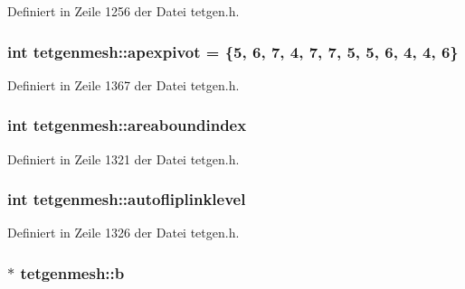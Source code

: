 Definiert in Zeile 1256 der Datei tetgen.\-h.

\hypertarget{classtetgenmesh_a0322a7ed3ee115cb852ae8d46e2b261c}{
\subsubsection[{apexpivot}]{\setlength{\rightskip}{0pt plus 5cm}int tetgenmesh\-::apexpivot = \{5, 6, 7, 4, 7, 7, 5, 5, 6, 4, 4, 6\}\hspace{0.3cm}{\ttfamily [static]}}}\label{classtetgenmesh_a0322a7ed3ee115cb852ae8d46e2b261c}


Definiert in Zeile 1367 der Datei tetgen.\-h.

\hypertarget{classtetgenmesh_abf62aababba80f7b7f19fa28151573d4}{
\subsubsection[{areaboundindex}]{\setlength{\rightskip}{0pt plus 5cm}int tetgenmesh\-::areaboundindex}}\label{classtetgenmesh_abf62aababba80f7b7f19fa28151573d4}


Definiert in Zeile 1321 der Datei tetgen.\-h.

\hypertarget{classtetgenmesh_a18729c9c93774bdb0397f9181ddc9609}{
\subsubsection[{autofliplinklevel}]{\setlength{\rightskip}{0pt plus 5cm}int tetgenmesh\-::autofliplinklevel}}\label{classtetgenmesh_a18729c9c93774bdb0397f9181ddc9609}


Definiert in Zeile 1326 der Datei tetgen.\-h.

\hypertarget{classtetgenmesh_ae28df2638f22659903e727e2ffa05357}{
\subsubsection[{b}]{$\ast$ tetgenmesh\-::b}}\label{classtetgenmesh_ae28df2638f22659903e727e2ffa05357}


